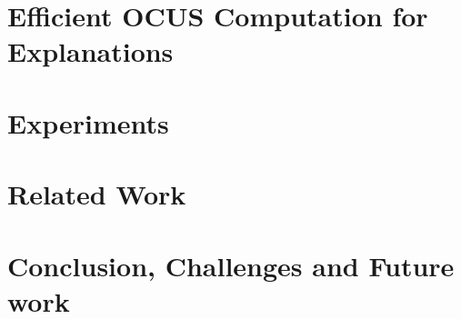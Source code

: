 \documentclass{article}
\begin{document}
\section{Efficient OCUS Computation for Explanations}\label{sec:ocusEx}


\section{Experiments}\label{sec:experiments}


\section{Related Work}\label{sec:related}


\section{Conclusion, Challenges and Future work}\label{sec:conclusion}


{
\small
%     

 
}
     
\end{document}
